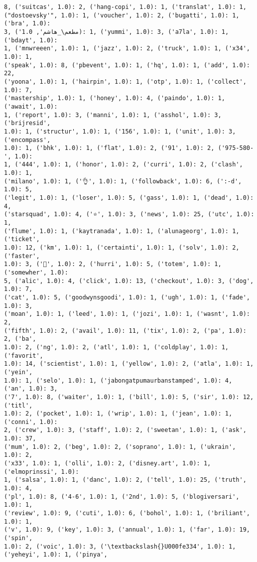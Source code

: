 \documentclass[11pt]{article}
\begin{document}
\begin{Verbatim}[commandchars=\\\{\}]
8, ('suitcas', 1.0): 2, ('hang-copi', 1.0): 1, ('translat', 1.0): 1,
("dostoevsky'", 1.0): 1, ('voucher', 1.0): 2, ('bugatti', 1.0): 1, ('bra', 1.0):
3, ('مطعم\_هاشم', 1.0): 1, ('yummi', 1.0): 3, ('a7la', 1.0): 1, ('bdayt', 1.0):
1, ('mnwreeen', 1.0): 1, ('jazz', 1.0): 2, ('truck', 1.0): 1, ('x34', 1.0): 1,
('speak', 1.0): 8, ('pbevent', 1.0): 1, ('hq', 1.0): 1, ('add', 1.0): 22,
('yoona', 1.0): 1, ('hairpin', 1.0): 1, ('otp', 1.0): 1, ('collect', 1.0): 7,
('mastership', 1.0): 1, ('honey', 1.0): 4, ('paindo', 1.0): 1, ('await', 1.0):
1, ('report', 1.0): 3, ('manni', 1.0): 1, ('asshol', 1.0): 3, ('brijresid',
1.0): 1, ('structur', 1.0): 1, ('156', 1.0): 1, ('unit', 1.0): 3, ('encompass',
1.0): 1, ('bhk', 1.0): 1, ('flat', 1.0): 2, ('91', 1.0): 2, ('975-580-', 1.0):
1, ('444', 1.0): 1, ('honor', 1.0): 2, ('curri', 1.0): 2, ('clash', 1.0): 1,
('milano', 1.0): 1, ('👌', 1.0): 1, ('followback', 1.0): 6, (':-d', 1.0): 5,
('legit', 1.0): 1, ('loser', 1.0): 5, ('gass', 1.0): 1, ('dead', 1.0): 4,
('starsquad', 1.0): 4, ('⭐', 1.0): 3, ('news', 1.0): 25, ('utc', 1.0): 1,
('flume', 1.0): 1, ('kaytranada', 1.0): 1, ('alunageorg', 1.0): 1, ('ticket',
1.0): 12, ('km', 1.0): 1, ('certainti', 1.0): 1, ('solv', 1.0): 2, ('faster',
1.0): 3, ('👊', 1.0): 2, ('hurri', 1.0): 5, ('totem', 1.0): 1, ('somewher', 1.0):
5, ('alic', 1.0): 4, ('click', 1.0): 13, ('checkout', 1.0): 3, ('dog', 1.0): 7,
('cat', 1.0): 5, ('goodwynsgoodi', 1.0): 1, ('ugh', 1.0): 1, ('fade', 1.0): 3,
('moan', 1.0): 1, ('leed', 1.0): 1, ('jozi', 1.0): 1, ('wasnt', 1.0): 2,
('fifth', 1.0): 2, ('avail', 1.0): 11, ('tix', 1.0): 2, ('pa', 1.0): 2, ('ba',
1.0): 2, ('ng', 1.0): 2, ('atl', 1.0): 1, ('coldplay', 1.0): 1, ('favorit',
1.0): 14, ('scientist', 1.0): 1, ('yellow', 1.0): 2, ('atla', 1.0): 1, ('yein',
1.0): 1, ('selo', 1.0): 1, ('jabongatpumaurbanstamped', 1.0): 4, ('an', 1.0): 3,
('7', 1.0): 8, ('waiter', 1.0): 1, ('bill', 1.0): 5, ('sir', 1.0): 12, ('titl',
1.0): 2, ('pocket', 1.0): 1, ('wrip', 1.0): 1, ('jean', 1.0): 1, ('conni', 1.0):
2, ('crew', 1.0): 3, ('staff', 1.0): 2, ('sweetan', 1.0): 1, ('ask', 1.0): 37,
('mum', 1.0): 2, ('beg', 1.0): 2, ('soprano', 1.0): 1, ('ukrain', 1.0): 2,
('x33', 1.0): 1, ('olli', 1.0): 2, ('disney.art', 1.0): 1, ('elmoprinssi', 1.0):
1, ('salsa', 1.0): 1, ('danc', 1.0): 2, ('tell', 1.0): 25, ('truth', 1.0): 4,
('pl', 1.0): 8, ('4-6', 1.0): 1, ('2nd', 1.0): 5, ('blogiversari', 1.0): 1,
('review', 1.0): 9, ('cuti', 1.0): 6, ('bohol', 1.0): 1, ('briliant', 1.0): 1,
('v', 1.0): 9, ('key', 1.0): 3, ('annual', 1.0): 1, ('far', 1.0): 19, ('spin',
1.0): 2, ('voic', 1.0): 3, ('\textbackslash{}U000fe334', 1.0): 1, ('yeheyi', 1.0): 1, ('pinya',

\end{Verbatim}
\end{document}
